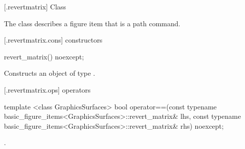  [\iotwod.revertmatrix] {Class }

\pnum
{}%
The class  describes a figure item that is a path command.

 [\iotwod.revertmatrix.cons] { constructors}

%
\begin{itemdecl}
revert_matrix() noexcept;
\end{itemdecl}
\begin{itemdescr}
\pnum
\effects
Constructs an object of type .
\end{itemdescr}

 [\iotwod.revertmatrix.ops]{ operators}

%
\begin{itemdecl}
template <class GraphicsSurfaces>
bool operator==(const typename basic_figure_items<GraphicsSurfaces>::revert_matrix& lhs,
  const typename basic_figure_items<GraphicsSurfaces>::revert_matrix& rhs) noexcept;
\end{itemdecl}
\begin{itemdescr}
\pnum
\returns
{}.
\end{itemdescr}
